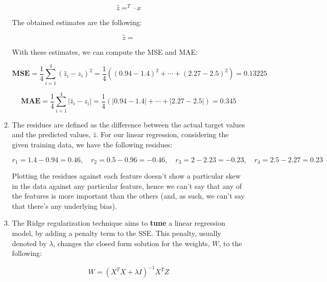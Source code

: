 \documentclass[12pt]{article}
\begin{document}
\begin{enumerate}[leftmargin=\labelsep]
\begin{enumerate}
{                \begin{equation*}
                  \hat{z} = ^T \cdot x
                \end{equation*}

                The obtained estimates are the following:

                \begin{equation*}
                  \hat{z} = 
                \end{equation*}

                With these estimates, we can compute the MSE and MAE:

                $$
                  \mathbf{MSE} = \frac{1}{4} \sum_{i=1}^4 (\hat{z}_i - z_i)^2
                  = \frac{1}{4} \left( (0.94 - 1.4)^2 + \cdots + (2.27 - 2.5)^2 \right)
                  = 0.13225
                $$

                $$
                  \mathbf{MAE} = \frac{1}{4} \sum_{i=1}^4 |\hat{z}_i - z_i|
                  = \frac{1}{4} \left( |0.94 - 1.4| + \cdots + |2.27 - 2.5| \right)
                  = 0.345
                $$
                }
          \item {
                The residues are defined as the difference between the actual target
                values and the predicted values, $\hat{z}$. For our linear regression,
                considering the given training data, we have the following residues:

                $$
                  r_1 = 1.4 - 0.94 = 0.46, \quad
                  r_2 = 0.5 - 0.96 = -0.46, \quad
                  r_3 = 2 - 2.23 = -0.23, \quad
                  r_4 = 2.5 - 2.27 = 0.23
                $$

                Plotting the residues against each feature doesn't show a particular
                skew in the data against any particular feature, hence we can't say
                that any of the features is more important than the others (and, as such,
                we can't say that there's any underlying bias).
                }
          \item {
                The Ridge regularization technique aims to \textbf{tune} a linear regression model,
                by adding a penalty term to the SSE. This penalty, usually denoted by $\lambda$,
                changes the closed form solution for the weights, $W$, to the following:

                \begin{equation*}
                  W = (X^T X + \lambda I)^{-1} X^T Z
                \end{equation*}

}
\end{enumerate}
\end{enumerate}
\end{document}
